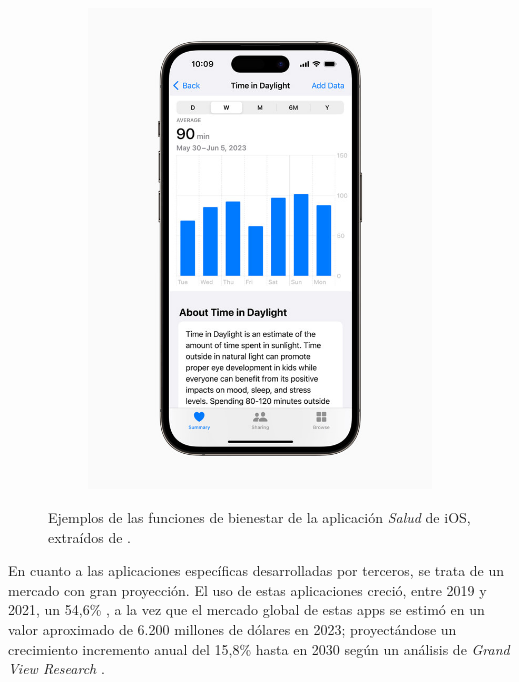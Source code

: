 \begin{figure}[h]
\begin{subfigure}[t]{0.49\textwidth}
                \includegraphics[width=1\linewidth]{figures/ios salud visual.jpg}
            \end{subfigure}
            \caption[Ejemplos de las funciones de bienestar de la aplicación \textit{Salud} de iOS]{Ejemplos de las funciones de bienestar de la aplicación \textit{Salud} de iOS, extraídos de \cite{apple_newsroom_apple_2023}.}
            \label{fig:estado_arte:ios_salud}
        \end{figure}

        En cuanto a las aplicaciones específicas desarrolladas por terceros, se trata de un mercado con gran proyección. El uso de estas aplicaciones creció, entre 2019 y 2021, un 54,6\% \cite{bejerano_lado_2023}, a la vez que el mercado global de estas apps se estimó en un valor aproximado de 6.200 millones de dólares en 2023; proyectándose un crecimiento incremento anual del 15,8\% hasta en 2030 según un análisis de \textit{Grand View Research} \cite{grand_view_research_mental_nodate}.
        
